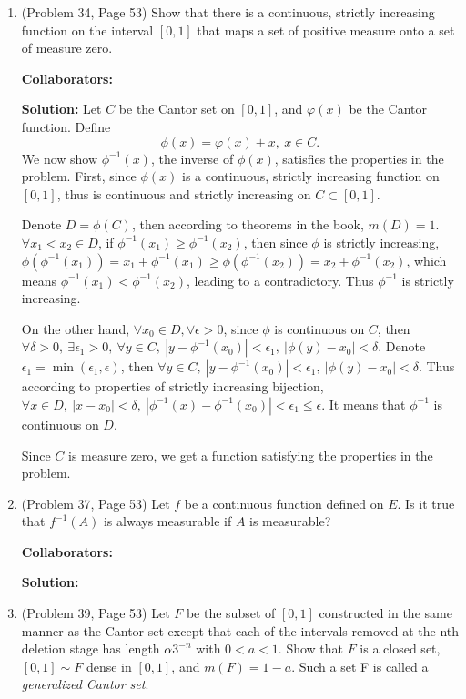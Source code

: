 \documentclass{article}%
\begin{document}
\begin{enumerate}
\item  (Problem 34, Page 53) Show that there is a continuous, strictly increasing function on the interval $[0, 1]$ that maps a
set of positive measure onto a set of measure zero.


\bigskip
\textbf{Collaborators:}\\
\smallskip
 
\textbf{Solution:}
Let $C$ be the Cantor set on $[0, 1]$, and $\varphi(x)$ be the Cantor function. Define
$$
\phi(x) = \varphi(x)+x, ~x\in C.
$$
We now show $\phi^{-1}(x)$, the inverse of $\phi(x)$, satisfies the properties in the problem.
First, since $\phi(x)$ is a continuous, strictly increasing function on $[0, 1]$, thus is continuous and strictly increasing on $C\subset [0, 1]$.

Denote $D = \phi(C)$, then according to theorems in the book, $m(D) = 1$. $\forall x_1 < x_2\in D$, if $\phi^{-1}(x_1) \ge \phi^{-1}(x_2)$, then since $\phi$ is strictly increasing, $\phi(\phi^{-1}(x_1)) = x_1+\phi^{-1}(x_1) \ge \phi(\phi^{-1}(x_2)) = x_2+\phi^{-1}(x_2)$, which means $\phi^{-1}(x_1) < \phi^{-1}(x_2)$, leading to a contradictory. Thus $\phi^{-1}$ is strictly increasing.

On the other hand, $\forall x_0 \in D, \forall \epsilon > 0$, since $\phi$ is continuous on $C$, then $\forall \delta > 0, ~\exists\epsilon_1 > 0, ~\forall y\in C, ~|y-\phi^{-1}(x_0)| < \epsilon_1, ~|\phi(y)-x_0| < \delta$. Denote $\epsilon_1 = \min(\epsilon_1, \epsilon)$, then $\forall y\in C, ~|y-\phi^{-1}(x_0)| < \epsilon_1, ~|\phi(y)-x_0| < \delta$. Thus according to properties of strictly increasing bijection, $\forall x\in D, ~|x-x_0| < \delta, ~|\phi^{-1}(x)-\phi^{-1}(x_0)| < \epsilon_1\le \epsilon$. It means that $\phi^{-1}$ is continuous on $D$.

Since $C$ is measure zero, we get a function satisfying the properties in the problem.
\bigskip

\item (Problem 37, Page 53) Let $f$ be a continuous function defined on $E$. Is it true that $f^{-1}(A)$ is always measurable if $A$ is measurable?


\bigskip
\textbf{Collaborators:}\\
\smallskip
 
\textbf{Solution:}

\bigskip



\item  (Problem 39, Page 53) Let $F$ be the subset of $[0, 1]$ constructed in the same manner as the Cantor set except that
each of the intervals removed at the nth deletion stage has length $\alpha 3^{-n}$ with $0 < a < 1$. Show
that $F$ is a closed set, $[0, 1]\sim F$ dense in $[0,1]$, and $m(F) = 1- a$. Such a set F is called a \emph{generalized Cantor set}.




\end{enumerate}
\end{document}
